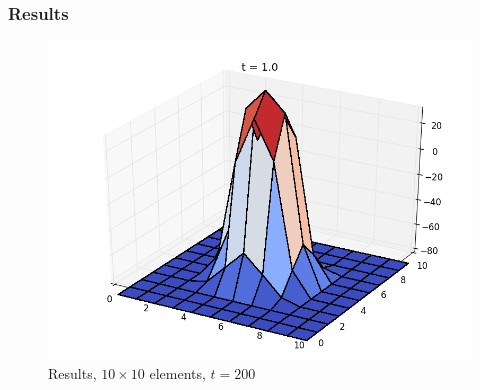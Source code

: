 \subsubsection{Results}
%
%
%


%
%  
%
%

\begin{figure}[ht]
  \centering 
  \includegraphics[width=0.9\columnwidth]{examples/example-0402/doc/figures/current_run_l1x1_n10x10_i1_s0_p1__t200.png} 
  \caption{Results, $10 \times 10$ elements, $t=200$}
  \label{example-0402-current-run1-fig}
\end{figure}

